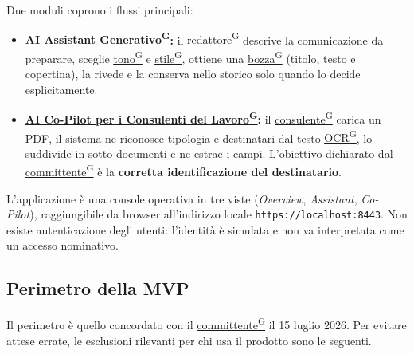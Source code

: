 \documentclass[a4paper,12pt]{article}
\providecommand{\glslink}[2]{\href{https://alittlebyte-19.github.io/Documentazione/glossario.html\#gls-#1}{\underline{#2}\textsuperscript{\scriptsize G}}}
\begin{document}
Due moduli coprono i flussi principali:

\begin{itemize}
    \item \textbf{\glslink{ai-assistant-generativo}{AI Assistant Generativo}:} il \glslink{redattore}{redattore} descrive la comunicazione da preparare, sceglie \glslink{tono-comunicativo}{tono} e \glslink{stile-editoriale}{stile}, ottiene una \glslink{bozza-draft}{bozza} (titolo, testo e copertina), la rivede e la conserva nello storico solo quando lo decide esplicitamente.
    \item \textbf{\glslink{ai-co-pilot-per-consulenti-del-lavoro-cdl}{AI Co-Pilot per i Consulenti del Lavoro}:} il \glslink{consulente-del-lavoro-cdl}{consulente} carica un PDF, il sistema ne riconosce tipologia e destinatari dal testo \glslink{ocr-riconoscimento-ottico-dei-caratteri}{OCR}, lo suddivide in sotto-documenti e ne estrae i campi. L'obiettivo dichiarato dal \glslink{committente-proponente}{committente} è la \textbf{corretta identificazione del destinatario}.
\end{itemize}

L'applicazione è una console operativa in tre viste (\textit{Overview}, \textit{Assistant}, \textit{Co-Pilot}), raggiungibile da browser all'indirizzo locale \texttt{https://localhost:8443}. Non esiste autenticazione degli utenti: l'identità è simulata e non va interpretata come un accesso nominativo.

\subsection{Perimetro della MVP}

Il perimetro è quello concordato con il \glslink{committente-proponente}{committente} il 15 luglio 2026. Per evitare attese errate, le esclusioni rilevanti per chi usa il prodotto sono le seguenti.
\end{document}

